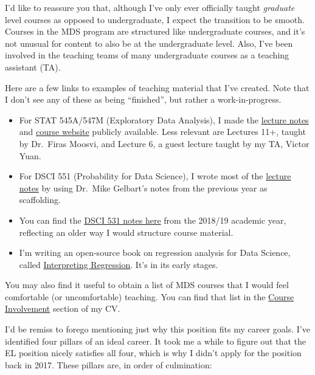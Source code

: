 \documentclass[]{article}
\providecommand{\tightlist}{%
  \setlength{\itemsep}{0pt}\setlength{\parskip}{0pt}}
\begin{document}
I'd like to reassure you that, although I've only ever officially taught \emph{graduate} level courses as opposed to undergraduate, I expect the transition to be smooth. Courses in the MDS program are structured like undergraduate courses, and it's not unusual for content to also be at the undergraduate level. Also, I've been involved in the teaching teams of many undergraduate courses as a teaching assistant (TA).

Here are a few links to examples of teaching material that I've created. Note that I don't see any of these as being ``finished'', but rather a work-in-progress.

\begin{itemize}
\tightlist
\item
  For STAT 545A/547M (Exploratory Data Analysis), I made the \href{https://stat545guidebook.netlify.com/}{lecture notes} and \href{https://stat545.stat.ubc.ca/}{course website} publicly available. Less relevant are Lectures 11+, taught by Dr.~Firas Moosvi, and Lecture 6, a guest lecture taught by my TA, Victor Yuan.
\item
  For DSCI 551 (Probability for Data Science), I wrote most of the \href{https://ubc-mds.github.io/DSCI_551_stat-prob-dsci/lectures/}{lecture notes} by using Dr.~Mike Gelbart's notes from the previous year as scaffolding.
\item
  You can find the \href{https://ubc-mds.github.io/DSCI_531_viz-1/}{DSCI 531 notes here} from the 2018/19 academic year, reflecting an older way I would structure course material.
\item
  I'm writing an open-source book on regression analysis for Data Science, called \href{https://interpreting-regression.netlify.com/}{Interpreting Regression}. It's in its early stages.
\end{itemize}

You may also find it useful to obtain a list of MDS courses that I would feel comfortable (or uncomfortable) teaching. You can find that list in the \protect\hyperlink{course-involvement}{Course Involvement} section of my CV.

I'd be remiss to forego mentioning just why this position fits my career goals. I've identified four pillars of an ideal career. It took me a while to figure out that the EL position nicely satisfies all four, which is why I didn't apply for the position back in 2017. These pillars are, in order of culmination:
\end{document}
